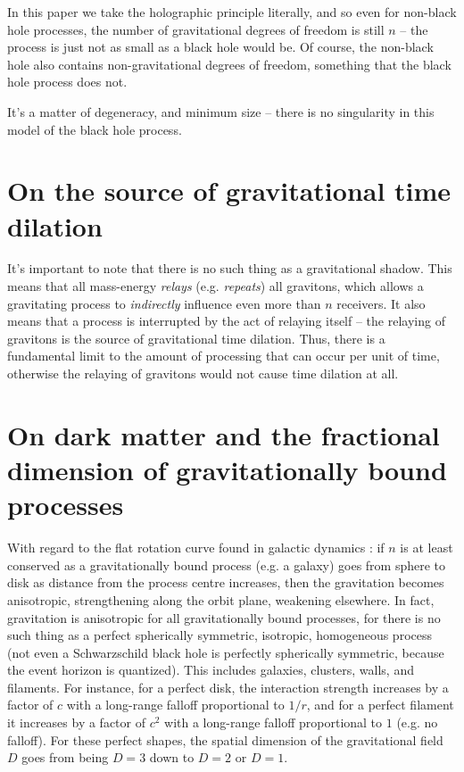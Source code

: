 \documentclass[12pt]{article}
\begin{document}
{In this paper we take the holographic principle literally, and so even for non-black hole processes, the number of gravitational degrees of freedom is still $n$ -- the process is just not as small as a black hole would be.
Of course, the non-black hole also contains non-gravitational degrees of freedom, something that the black hole process does not.

It's a matter of degeneracy, and minimum size -- there is no singularity in this model of the black hole process.






\section{On the source of gravitational time dilation}
It's important to note that there is no such thing as a gravitational shadow.
This means that all mass-energy {\textit{relays}} (e.g. {\textit{repeats}}) all gravitons, which allows a gravitating process to {\textit{indirectly}} influence even more than $n$ receivers.
It also means that a process is interrupted by the act of relaying itself -- the relaying of gravitons is the source of gravitational time dilation.
Thus, there is a fundamental limit to the amount of processing that can occur per unit of time, otherwise the relaying of gravitons would not cause time dilation at all.





\section{On dark matter and the fractional dimension of gravitationally bound processes}

With regard to the flat rotation curve found in galactic dynamics \cite{binney}: if $n$ is at least conserved as a gravitationally bound process (e.g. a galaxy) goes from sphere to disk as distance from the process centre increases, then the gravitation becomes anisotropic, strengthening along the orbit plane, weakening elsewhere.
In fact, gravitation is anisotropic for all gravitationally bound processes, for there is no such thing as a perfect spherically symmetric, isotropic, homogeneous process (not even a Schwarzschild black hole is perfectly spherically symmetric, because the event horizon is quantized).
This includes galaxies, clusters, walls, and filaments.
For instance, for a perfect disk, the interaction strength increases by a factor of $c$ with a long-range falloff proportional to $1/r$, and for a perfect filament it increases by a factor of $c^2$ with a long-range falloff proportional to $1$ (e.g. no falloff).
For these perfect shapes, the spatial dimension of the gravitational field $D$ goes from being $D = 3$ down to $D = 2$ or $D = 1$.

}
\end{document}
